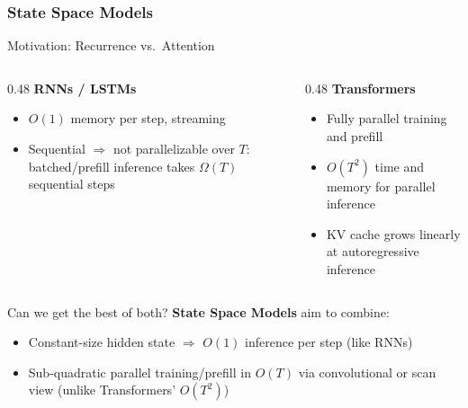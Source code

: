 \subsubsection{State Space Models}

\begin{frame}{Motivation: Recurrence vs.\ Attention}

  \begin{columns}
    \begin{column}{0.48\textwidth}
      \textbf{RNNs / LSTMs}
      \begin{itemize}
        \item $O(1)$ memory per step, streaming
        \item Sequential $\Rightarrow$ \alert{not parallelizable} over $T$: batched/prefill inference takes $\Omega(T)$ sequential steps
      \end{itemize}
    \end{column}
    \begin{column}{0.48\textwidth}
      \textbf{Transformers}
      \begin{itemize}
        \item Fully parallel training and prefill
        \item \alert{$O(T^2)$} time and memory for parallel inference
        \item KV cache grows linearly at autoregressive inference
      \end{itemize}
    \end{column}
  \end{columns}

  \vspace{0.8em}
  \begin{alertblock}{Can we get the best of both?}
    \textbf{State Space Models} aim to combine:
    \begin{itemize}
      \item Constant-size hidden state $\Rightarrow$ $O(1)$ inference per step (like RNNs)
      \item Sub-quadratic parallel training/prefill in $O(T)$ via convolutional or scan view (unlike Transformers' $O(T^2)$)
    \end{itemize}
  \end{alertblock}
\end{frame}

